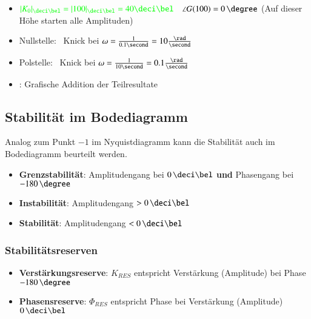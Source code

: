   \begin{itemize}
    \item $ \cgn{|K_0|_{\deci \bel} = |100|_{\deci \bel} = 40 \deci \bel}$ \textrightarrow\ $\angle G(100) = 0 \, \degree$ (Auf dieser Höhe starten alle Amplituden)
    \item Nullstelle:  \textrightarrow\ Knick bei $\omega = \frac{1}{0.1 \second} = 10 \frac{\rad}{\second}$
    \item Polstelle:  \textrightarrow\ Knick bei $\omega = \frac{1}{10 \second} = 0.1 \frac{\rad}{\second}$
    \item {}: Grafische Addition der Teilresultate
  \end{itemize}





\subsection{Stabilität im Bodediagramm}
Analog zum Punkt $-1$ im Nyquistdiagramm kann die Stabilität auch im Bodediagramm beurteilt werden.

\begin{itemize}
    \item \textbf{Grenzstabilität}: Amplitudengang bei $0 \, \deci \bel$ \textbf{und} Phasengang bei $-180 \, \degree$
    \item \textbf{Instabilität}: Amplitudengang $>0 \, \deci \bel$
    \item \textbf{Stabilität}: Amplitudengang $<0 \, \deci \bel$
\end{itemize}


\subsubsection{Stabilitätsreserven}

\begin{itemize}
    \item \textbf{Verstärkungsreserve}: $K_{RES}$ entspricht Verstärkung (Amplitude) bei Phase $-180 \, \degree$
    \item \textbf{Phasensreserve}: $\Phi_{RES}$ entspricht Phase bei Verstärkung (Amplitude) $0 \, \deci \bel$
\end{itemize}
